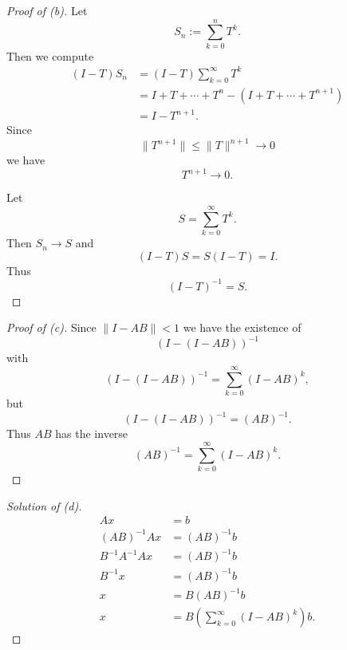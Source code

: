 \begin{proof}[Proof of (b)]
    Let 
    \[
        S_n := \sum_{k=0}^n T^k. 
    \]
    Then we compute 
    \begin{align*}
        (I-T)S_n 
        &= (I-T)\sum_{k=0}^\infty T^k \\ 
        &= I + T + \cdots + T^n - (I + T + \cdots + T^{n+1}) \\ 
        &= I - T^{n+1}.
    \end{align*}
    Since 
    \[
        \|T^{n+1}\| \leq \|T\|^{n+1} \to 0 
    \]
    we have 
    \[
        T^{n+1} \to 0.
    \]

    Let 
    \[
        S = \sum_{k=0}^\infty T^k. 
    \]
    Then $S_n \to S$ and 
    \[
        (I-T)S = S(I-T) = I. 
    \]
    Thus 
    \[
        (I-T)^{-1} = S.
    \]
\end{proof}
\begin{proof}[Proof of (c)]
    Since $\|I-AB\| < 1$ we have the existence of 
    \[
        (I-(I-AB))^{-1}
    \] 
    with 
    \[
        (I-(I-AB))^{-1} = \sum_{k=0}^\infty (I-AB)^k,
    \]
    but 
    \[
        (I-(I-AB))^{-1} = (AB)^{-1}. 
    \]
    Thus $AB$ has the inverse 
    \[
        (AB)^{-1} = \sum_{k=0}^\infty (I-AB)^k.
    \]
\end{proof}
\begin{proof}[Solution of (d)]
    \begin{align*}
        Ax &= b \\ 
        (AB)^{-1}Ax &= (AB)^{-1}b \\ 
        B^{-1}A^{-1}Ax &= (AB)^{-1}b \\ 
        B^{-1}x &= (AB)^{-1}b \\ 
        x &= B(AB)^{-1}b \\ 
        x &= B\left(\sum_{k=0}^\infty (I-AB)^k\right)b.
    \end{align*}
\end{proof}

